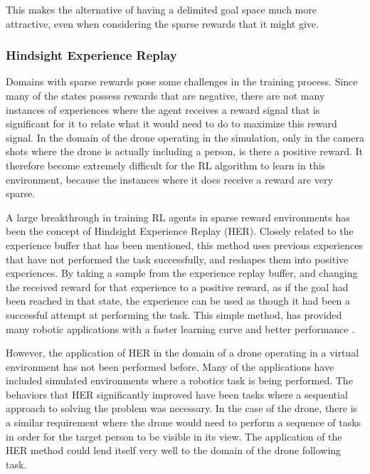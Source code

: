 This makes the alternative of having a delimited goal space much more attractive, 
even when considering the sparse rewards that it might give. 

\subsubsection{Hindsight Experience Replay}
Domains with sparse rewards pose some challenges in the training process. Since 
many of the states possess rewards that are negative, there are not many instances 
of experiences where the agent receives a reward signal that is significant for it 
to relate what it would need to do to maximize this reward signal. In the domain of 
the drone operating in the simulation, only in the camera shots where the drone is actually 
including a person, is there a positive reward. It therefore become extremely 
difficult for the RL algorithm to learn in this environment, because the instances 
where it does receive a reward are very sparse. 

A large breakthrough in 
training RL agents in sparse reward environments has been the concept of 
Hindsight Experience Replay (HER). Closely related to the experience buffer that 
has been mentioned, this method uses previous experiences that have not performed 
the task successfully, and reshapes them into positive experiences. By taking a 
sample from the experience replay buffer, and changing the received reward for 
that experience to a positive reward, as if the goal had been reached in that state, 
the experience can be used as though it had been a successful attempt at performing 
the task. This simple method, has provided many robotic applications with a faster 
learning curve and better performance \cite{HER}. 

However, the application of HER in the domain of a drone operating in a virtual 
environment has not been performed before. Many of the applications have included 
simulated environments where a robotics task is being performed. The 
behaviors that HER significantly improved have been tasks where a sequential 
approach to solving the problem was necessary. In the case of the drone, there 
is a similar requirement where the drone would need to perform a sequence of tasks 
in order for the target person to be visible in its view. The application of 
the HER method could lend itself very well to the domain of the drone following 
task. 

